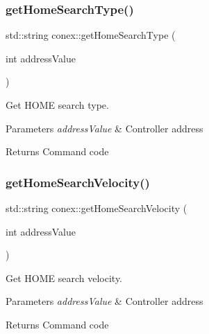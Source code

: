 \subsubsection{\texorpdfstring{get\+Home\+Search\+Type()}{getHomeSearchType()}}
{\footnotesize\ttfamily std\+::string conex\+::get\+Home\+Search\+Type (\begin{DoxyParamCaption}\item[{int}]{address\+Value }\end{DoxyParamCaption})}



Get H\+O\+ME search type. 


\begin{DoxyParams}{Parameters}
{\em address\+Value} & Controller address \\
\hline
\end{DoxyParams}
\begin{DoxyReturn}{Returns}
Command code 
\end{DoxyReturn}
\mbox{\label{namespaceconex_a9bf3d6adb4fd4d48f95b2c27169ef773}} 
\subsubsection{\texorpdfstring{get\+Home\+Search\+Velocity()}{getHomeSearchVelocity()}}
{\footnotesize\ttfamily std\+::string conex\+::get\+Home\+Search\+Velocity (\begin{DoxyParamCaption}\item[{int}]{address\+Value }\end{DoxyParamCaption})}



Get H\+O\+ME search velocity. 


\begin{DoxyParams}{Parameters}
{\em address\+Value} & Controller address \\
\hline
\end{DoxyParams}
\begin{DoxyReturn}{Returns}
Command code 
\end{DoxyReturn}
\mbox{\label{namespaceconex_a44852cd57a643f1a70ffff0ba772b28b}} 
